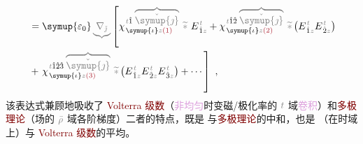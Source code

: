 \begin{subequations}
\begin{align}
	&\hphantom{:}= {\symup{\varepsilon_0}} \mathcolor{gray}{\underbrace{\nabla_{\check{\jmath}}}} \left[ \chi^{\;\! \mathcolor{gray}{t} \hat{1} \;\! \mathcolor{gray}{\overbrace{\check{\symup{\jmath}}}}}_{\;\! \symup{\iota} \mathcolor{gray}{z} \textcolor{Maroon}{(1)}} ~\mathcolor{gray}{\widetilde *}~ E^{\;\!\mathcolor{gray}{t}}_{\;\! \hat{1} \mathcolor{gray}{z}} + \chi^{\;\! \mathcolor{gray}{t} \hat{1} \hat{2} \;\! \mathcolor{gray}{\overbrace{\check{\symup{\jmath}}}}}_{\;\! \symup{\iota} \mathcolor{gray}{z} \textcolor{Maroon}{(2)}} ~\mathcolor{gray}{\widetilde *} \left( E^{\;\!\mathcolor{gray}{t}}_{\;\! \hat{1} \mathcolor{gray}{z}} E^{\;\!\mathcolor{gray}{t}}_{\;\! \hat{2} \mathcolor{gray}{z}} \right) \right. \label{eq:D_trho2} \\ &\hphantom{:}+ \left. \chi^{\;\! \mathcolor{gray}{t} \hat{1} \hat{2} \hat{3} \;\! \mathcolor{gray}{\overbrace{\check{\symup{\jmath}}}}}_{\;\! \symup{\iota} \mathcolor{gray}{z} \textcolor{Maroon}{(3)}} ~\mathcolor{gray}{\widetilde *} \left( E^{\;\!\mathcolor{gray}{t}}_{\;\! \hat{1} \mathcolor{gray}{z}} E^{\;\!\mathcolor{gray}{t}}_{\;\! \hat{2} \mathcolor{gray}{z}} E^{\;\!\mathcolor{gray}{t}}_{\;\! \hat{3} \mathcolor{gray}{z}} \right) + \cdots \right]~,
\end{align}
\end{subequations}
该表达式兼顾地吸收了 \textcolor{Maroon}{Volterra 级数}（\textcolor{Plum}{非均匀}时变磁/极化率的 $\mathcolor{gray}{t}$ 域\textcolor{Plum}{卷积}）和\textcolor{Maroon}{多极理论}（场的 $\mathcolor{gray}{\bar{\rho}}$ 域各阶梯度）二者的特点，既是  与\textcolor{Maroon}{多极理论}的中和，也是 （在时域上）与 \textcolor{Maroon}{Volterra 级数}的平均。


